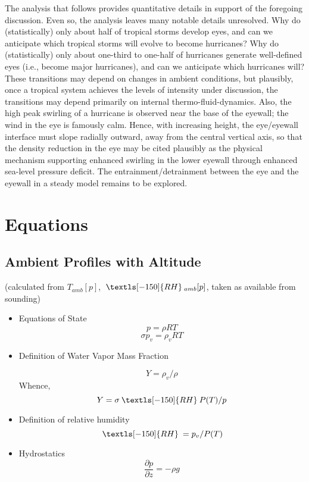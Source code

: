 \documentclass[preprint, prX]{revtex4}
\newcommand{\pd}[2]{\frac{\partial#1}{\partial#2}}
\newcommand{\rh}{\:\textls[-150]{RH}\:}
\begin{document}
The analysis that follows provides quantitative details in support of the foregoing discussion. Even so, the analysis leaves many notable details unresolved. Why do (statistically) only about half of tropical storms develop eyes, and can we anticipate which tropical storms will evolve to become hurricanes? Why do (statistically) only about one-third to one-half of hurricanes generate well-defined eyes (i.e., become major hurricanes), and can we anticipate which hurricanes will? These transitions may depend on changes in ambient conditions, but plausibly, once a tropical system achieves the levels of intensity under discussion, the transitions may depend primarily on internal thermo-fluid-dynamics. Also, the high peak swirling of a hurricane is observed near the base of the eyewall; the wind in the eye is famously calm. Hence, with increasing height, the eye/eyewall interface must slope radially outward, away from the central vertical axis, so that the density reduction in the eye may be cited plausibly as the physical mechanism supporting enhanced swirling in the lower eyewall through enhanced sea-level pressure deficit. The entrainment/detrainment between the eye and the eyewall in a steady model remains to be explored.

\section{Equations}

\subsection{Ambient Profiles with Altitude  }
(calculated from $T_{amb}[p]$, $ \rh_{amb}[p]$, taken as available from sounding)
\begin{itemize}

\item Equations of State
\begin{equation}
	p = \rho R T
\end{equation}
\begin{equation}
	\sigma p_v = \rho_v R T
\end{equation}

\item Definition of Water Vapor Mass Fraction

\begin{equation}
	Y = \rho_v / \rho
\end{equation}
Whence,
\begin{equation}
	Y = \sigma \rh P(T) / p
\end{equation}

\item Definition of relative humidity
\begin{equation}
	\rh = p_v / P(T)
\end{equation}

\item Hydrostatics
\begin{equation}
	\pd{p}{z} = -\rho g
\end{equation}

\end{itemize}
\end{document}
